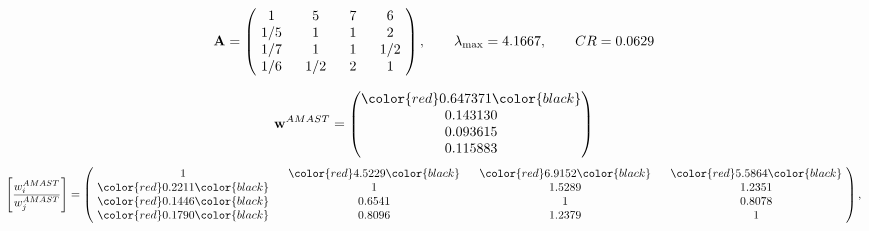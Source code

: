 \begin{example}
\begin{equation*}
\mathbf{A} =
\begin{pmatrix}
$\,\,$ 1 $\,\,$ & $\,\,$5$\,\,$ & $\,\,$7$\,\,$ & $\,\,$6 $\,\,$ \\
$\,\,$ 1/5$\,\,$ & $\,\,$ 1 $\,\,$ & $\,\,$1$\,\,$ & $\,\,$2 $\,\,$ \\
$\,\,$ 1/7$\,\,$ & $\,\,$ 1 $\,\,$ & $\,\,$ 1 $\,\,$ & $\,\,$ 1/2 $\,\,$ \\
$\,\,$ 1/6$\,\,$ & $\,\,$ 1/2$\,\,$ & $\,\,$2$\,\,$ & $\,\,$ 1  $\,\,$ \\
\end{pmatrix},
\qquad
\lambda_{\max} =
4.1667,
\qquad
CR = 0.0629
\end{equation*}

\begin{equation*}
\mathbf{w}^{AMAST} =
\begin{pmatrix}
\color{red} 0.647371\color{black} \\
0.143130\\
0.093615\\
0.115883
\end{pmatrix}\end{equation*}
\begin{equation*}
\left[ \frac{{w}^{AMAST}_i}{{w}^{AMAST}_j} \right] =
\begin{pmatrix}
$\,\,$ 1 $\,\,$ & $\,\,$\color{red} 4.5229\color{black} $\,\,$ & $\,\,$\color{red} 6.9152\color{black} $\,\,$ & $\,\,$\color{red} 5.5864\color{black} $\,\,$ \\
$\,\,$\color{red} 0.2211\color{black} $\,\,$ & $\,\,$ 1 $\,\,$ & $\,\,$1.5289$\,\,$ & $\,\,$1.2351  $\,\,$ \\
$\,\,$\color{red} 0.1446\color{black} $\,\,$ & $\,\,$0.6541$\,\,$ & $\,\,$ 1 $\,\,$ & $\,\,$0.8078 $\,\,$ \\
$\,\,$\color{red} 0.1790\color{black} $\,\,$ & $\,\,$0.8096$\,\,$ & $\,\,$1.2379$\,\,$ & $\,\,$ 1  $\,\,$ \\
\end{pmatrix},
\end{equation*}


\end{example}
